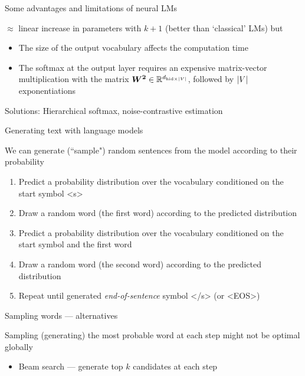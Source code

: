 \documentclass[12pt,aspectratio=169,handout]{beamer}
\begin{document}
\begin{frame}{Some advantages and limitations of neural LMs}
	
	$\approx$ linear increase in parameters with $k + 1$ (better than `classical' LMs) but
	\begin{itemize}
		\item The size of the output vocabulary affects the computation time
		\item The softmax at the output layer requires an expensive matrix-vector multiplication with the matrix $\bm{W^2} \in \mathbb{R}^{d_{\text{hid} \times \abs{V}}}$, followed by $\abs{V}$ exponentiations
	\end{itemize}
	
	Solutions: Hierarchical softmax, noise-contrastive estimation
	
\end{frame}

\begin{frame}{Generating text with language models}
	
	We can generate (``sample") random sentences from the model according to their probability
	
	\begin{enumerate}
		\item Predict a probability distribution over the vocabulary conditioned on the start symbol <s>
		\item Draw a random word (the first word) according to the predicted distribution
		\item Predict a probability distribution over the vocabulary conditioned on the start symbol and the first word
		\item Draw a random word (the second word) according to the predicted distribution
		\item Repeat until generated \emph{end-of-sentence} symbol </s> (or <EOS>)
	\end{enumerate}
	
	
\end{frame}

\begin{frame}{Sampling words --- alternatives}
	
	Sampling (generating) the most probable word at each step might not be optimal globally
	
	\begin{itemize}
		\item Beam search --- generate top $k$ candidates at each step
	\end{itemize}
	
\end{frame}
\end{document}
